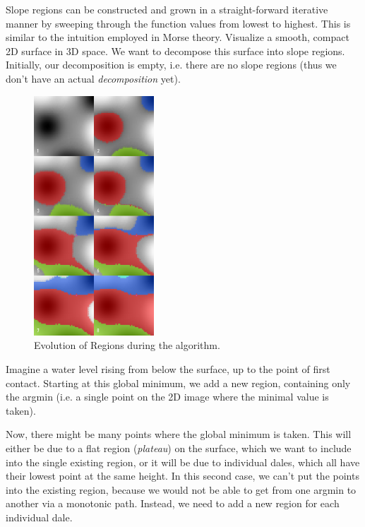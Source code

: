 \documentclass[a4paper,12pt,notitlepage,fullpage]{paper}
\theoremstyle{plain}
\theoremstyle{definition}
\begin{document}
Slope regions can be constructed and grown in a straight-forward iterative manner by sweeping through the function values from lowest to highest. 
This is similar to the intuition employed in Morse theory\cite{MatsumotoYukio2002AitM}.
Visualize a smooth, compact 2D surface in 3D space.
We want to decompose this surface into slope regions.
Initially, our decomposition is empty, i.e. there are no slope regions (thus we don't have an actual \emph{decomposition} yet).

\begin{figure}
\centering
\includegraphics[width=0.4\textwidth]{img/slope_evolution.png}
\caption{Evolution of Regions during the algorithm.}
\label{fig:evolution}
\end{figure}

Imagine a water level rising from below the surface, up to the point of first contact.
Starting at this global minimum, we add a new region, containing only the argmin (i.e. a single point on the 2D image where the minimal value is taken).

Now, there might be many points where the global minimum is taken.
This will either be due to a flat region (\emph{plateau}) on the surface, which we want to include into the single existing region, or it will be due to individual dales, which all have their lowest point at the same height.
In this second case, we can't put the points into the existing region, because we would not be able to get from one argmin to another via a monotonic path.
Instead, we need to add a new region for each individual dale.
\end{document}
